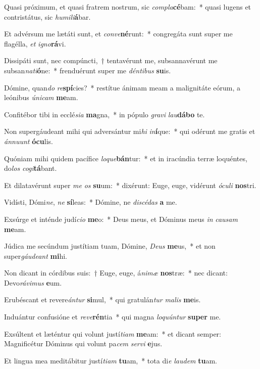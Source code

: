 \item Quasi próximum, et quasi fratrem nostrum, sic \textit{com}\textit{pla}\textbf{cé}bam:~* quasi lugens et contristátus, sic \textit{hu}\textit{mi}\textit{li}\textbf{á}bar.
\item Et advérsum me lætáti sunt, et \textit{con}\textit{ve}\textbf{né}runt:~* congregáta sunt super me flagélla, \textit{et} \textit{i}\textit{gno}\textbf{rá}vi.
\item Dissipáti sunt, nec compúncti,~† tentavérunt me, subsannavérunt me subsan\textit{na}\textit{ti}\textbf{ó}ne:~* frenduérunt super me \textit{dén}\textit{ti}\textit{bus} \textbf{su}is.
\item Dómine, quan\textit{do} \textit{re}\textbf{spí}cies?~* restítue ánimam meam a malignitáte eórum, a leónibus \textit{ú}\textit{ni}\textit{cam} \textbf{me}am.
\item Confitébor tibi in ecclé\textit{si}\textit{a} \textbf{ma}gna,~* in pópulo \textit{gra}\textit{vi} \textit{lau}\textbf{dá}\textbf{bo} te.
\item Non supergáudeant mihi qui adversántur mi\textit{hi} \textit{in}\textbf{í}que:~* qui odérunt me gratis et \textit{án}\textit{nu}\textit{unt} \textbf{ó}\textbf{cu}lis.
\item Quóniam mihi quidem pacífice \textit{lo}\textit{que}\textbf{bán}tur:~* et in iracúndia terræ loquéntes, do\textit{los} \textit{co}\textit{gi}\textbf{tá}bant.
\item Et dilatavérunt super \textit{me} \textit{os} \textbf{su}um:~* dixérunt: Euge, euge, vidérunt \textit{ó}\textit{cu}\textit{li} \textbf{nos}tri.
\item Vidísti, Dómi\textit{ne}, \textit{ne} \textbf{sí}leas:~* Dómine, ne \textit{di}\textit{scé}\textit{das} \textbf{a} me.
\item Exsúrge et inténde judí\textit{ci}\textit{o} \textbf{me}o:~* Deus meus, et Dóminus meus \textit{in} \textit{cau}\textit{sam} \textbf{me}am.
\item Júdica me secúndum justítiam tuam, Dómine, \textit{De}\textit{us} \textbf{me}us,~* et non super\textit{gáu}\textit{de}\textit{ant} \textbf{mi}hi.
\item Non dicant in córdibus suis:~† Euge, euge, á\textit{ni}\textit{mæ} \textbf{nos}træ:~* nec dicant: Devo\textit{rá}\textit{vi}\textit{mus} \textbf{e}um.
\item Erubéscant et revere\textit{án}\textit{tur} \textbf{si}mul,~* qui gratulán\textit{tur} \textit{ma}\textit{lis} \textbf{me}is.
\item Induántur confusióne et \textit{re}\textit{ve}\textbf{rén}tia~* qui magna \textit{lo}\textit{quún}\textit{tur} \textbf{su}\textbf{per} me.
\item Exsúltent et læténtur qui volunt justí\textit{ti}\textit{am} \textbf{me}am:~* et dicant semper: Magnificétur Dóminus qui volunt pa\textit{cem} \textit{ser}\textit{vi} \textbf{e}jus.
\item Et lingua mea meditábitur justí\textit{ti}\textit{am} \textbf{tu}am,~* tota di\textit{e} \textit{lau}\textit{dem} \textbf{tu}am.
